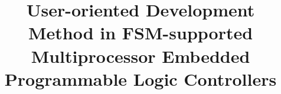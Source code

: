 \documentclass[journal,UTF8]{IEEEtran}
\begin{document}
	\title{User-oriented Development Method in FSM-supported Multiprocessor Embedded Programmable Logic Controllers}
	
	
	
	
	
	
	
	
	
\end{document}

